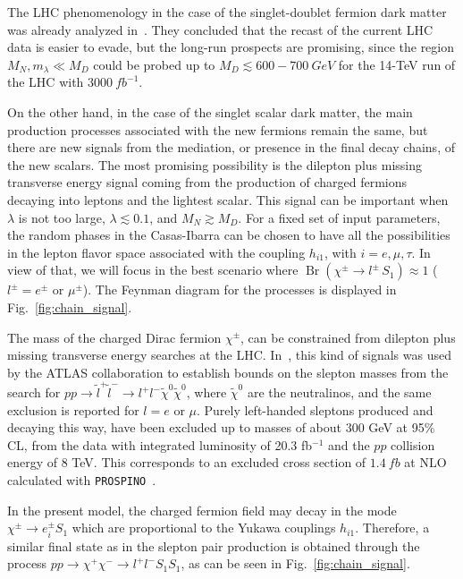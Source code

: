 The LHC phenomenology in the case of the singlet-doublet fermion
dark matter was already analyzed in~\cite{Abe:2014gua}. They concluded that
the recast of the current LHC data is easier to evade, but the
long-run prospects are promising, since the region $M_N,m_\lambda\ll M_D$ could be 
probed up to $M_D\lesssim 600-\SI{700}{GeV}$ for the 14-TeV run of the LHC with 
$\SI{3000}{fb}^{-1}$. 

On the other hand, in the case of the singlet scalar dark matter, the
main production processes associated with the new fermions remain the
same, but there are new signals from the mediation, or presence in the
final decay chains, of the new scalars.
The most promising possibility is the dilepton plus missing
transverse energy signal coming from the production of
charged fermions decaying into leptons and the lightest scalar.
This signal can be important when $\lambda$ is
not too large, $\lambda\lesssim 0.1$, and $M_N\gtrsim M_D$. 
For a fixed set of input parameters, the random phases in the
Casas-Ibarra can be chosen to have all the possibilities in the lepton
flavor space associated with the coupling $h_{i1}$, with
$i=e,\mu,\tau$. 
In view of that, we will focus in the best scenario where
$\operatorname{Br}(\chi^\pm\to l^\pm \, S_1 )\approx 1$ ($l^\pm=e^\pm$ or
$\mu^\pm$). 
The Feynman diagram for the processes is displayed in
Fig.~\ref{fig:chain_signal}.

   
The mass of the  charged  Dirac fermion $\chi^{\pm}$, can be
constrained from dilepton plus missing transverse energy  searches at the  LHC.
In~\cite{Aad:2014vma}, this kind of signals was used by the ATLAS
collaboration to establish bounds on the slepton masses from the
search for $pp \rightarrow \tilde{l}^+\tilde{l}^- \rightarrow l^+l^-
\tilde{\chi}^0\tilde{\chi}^0$, where $\tilde{\chi}^{0}$ are the neutralinos,
and the same exclusion is reported for $l=e$ or $\mu$.
Purely left-handed sleptons produced and decaying this way, have been
excluded up to masses of about $300$ GeV at 95\% CL, from the data
with integrated luminosity of 20.3 fb$^{-1}$ and the $pp$ collision
energy of 8 TeV. 
This corresponds to an excluded cross section of $\SI{1.4}{fb}$ at NLO
calculated with \texttt{PROSPINO}~\cite{Beenakker:1996ed}.

In the present model, the charged fermion field may decay in the
mode $\chi^{\pm} \rightarrow e_i^{\pm}S_1$ which are
proportional to the Yukawa couplings $h_{i1}$. 
Therefore, a similar final state as in the slepton pair production is
obtained through the process $pp \rightarrow \chi^+\chi^- \rightarrow
l^+l^- S_1 S_1$, as can be seen in Fig.~\ref{fig:chain_signal}.


